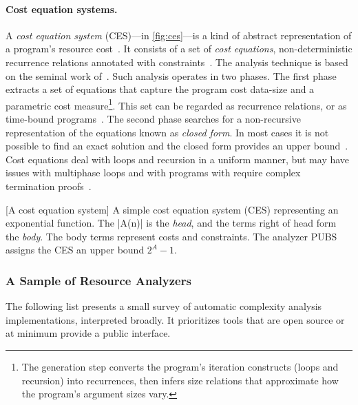 \paragraph*{Cost equation systems.}
A \emph{cost equation system} (CES)---in \autoref{fig:ces}---is a kind of abstract representation of a program's resource cost~\cite{floresmontoya2017}.
It consists of a set of \emph{cost equations}, \ie non-deterministic recurrence relations annotated with constraints~\cite{floresmontoya2014}.
The analysis technique is based on the seminal work of~\textcite{wegbreit1975}.
Such analysis operates in two phases.
The first phase extracts a set of equations that capture the program cost \wrt data-size and a parametric cost measure\footnote{
The generation step converts the program's iteration constructs (loops and recursion) into recurrences,
then infers size relations that approximate how the program's argument sizes vary.}.
This set can be regarded as recurrence relations, or as time-bound programs~\cite{rosendahl1989}.
The second phase searches for a non-recursive representation of the equations known as \emph{closed form}.
In most cases it is not possible to find an exact solution and the closed form provides an upper bound~\cite{albert2008}.
Cost equations deal with loops and recursion in a uniform manner,
but may have issues with multiphase loops and with programs with require complex termination proofs~\cite{floresmontoya2014}.

\begin{center}
\begin{minipage}{\textwidth}
[A cost equation system]{
A simple cost equation system (CES) representing an exponential function.
The \pr|A(n)| is the \emph{head}, and the terms right of head form the \emph{body}.
The body terms represent costs and constraints.
The analyzer PUBS assigns the CES an upper bound \(2^A-1\).}
\label{fig:ces}
\end{minipage}
\end{center}

\subsubsection{A Sample of Resource Analyzers}
\label{resource-analysis-tools}

The following list presents a small survey of automatic complexity analysis implementations, interpreted broadly.
It prioritizes tools that are open source or at minimum provide a public interface.

